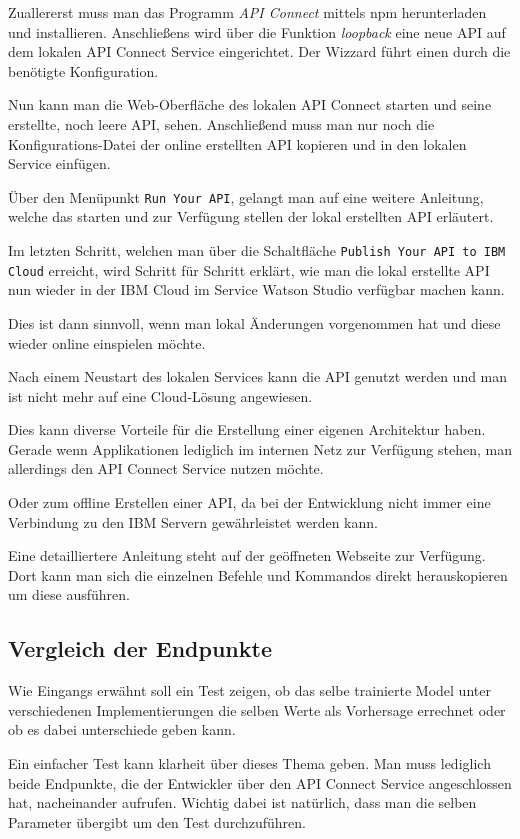 Zuallererst muss man das Programm \textit{API Connect} mittels npm herunterladen und installieren. Anschließens wird über
die Funktion \textit{loopback} eine neue API auf dem lokalen API Connect Service eingerichtet. Der Wizzard führt einen
durch die benötigte Konfiguration.

Nun kann man die Web-Oberfläche des lokalen API Connect starten und seine erstellte, noch leere API, sehen. Anschließend
muss man nur noch die Konfigurations-Datei der online erstellten API kopieren und in den lokalen Service einfügen.

Über den Menüpunkt \texttt{Run Your API}, gelangt man auf eine weitere Anleitung, welche das starten und zur Verfügung
stellen der lokal erstellten API erläutert.

Im letzten Schritt, welchen man über die Schaltfläche \texttt{Publish Your API to IBM Cloud} erreicht, wird Schritt für
Schritt erklärt, wie man die lokal erstellte API nun wieder in der IBM Cloud im Service Watson Studio verfügbar machen
kann.

Dies ist dann sinnvoll, wenn man lokal Änderungen vorgenommen hat und diese wieder online einspielen möchte.

Nach einem Neustart des lokalen Services kann die API genutzt werden und man ist nicht mehr auf eine Cloud-Lösung
angewiesen.

Dies kann diverse Vorteile für die Erstellung einer eigenen Architektur haben. Gerade wenn Applikationen lediglich im
internen Netz zur Verfügung stehen, man allerdings den API Connect Service nutzen möchte.

Oder zum offline Erstellen einer API, da bei der Entwicklung nicht immer eine Verbindung zu den IBM Servern gewährleistet
werden kann.

Eine detailliertere Anleitung steht auf der geöffneten Webseite zur Verfügung. Dort kann man sich die einzelnen Befehle
und Kommandos direkt herauskopieren um diese ausführen.

\subsection{Vergleich der Endpunkte}
Wie Eingangs erwähnt soll ein Test zeigen, ob das selbe trainierte Model unter verschiedenen Implementierungen die selben
Werte als Vorhersage errechnet oder ob es dabei unterschiede geben kann.

Ein einfacher Test kann klarheit über dieses Thema geben. Man muss lediglich beide Endpunkte, die der Entwickler über 
den API Connect Service angeschlossen hat, nacheinander aufrufen. Wichtig dabei ist natürlich, dass man die selben 
Parameter übergibt um den Test durchzuführen.

